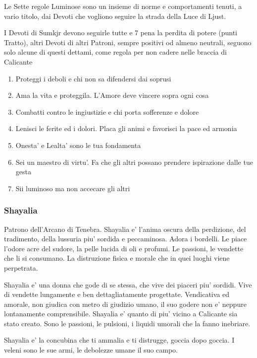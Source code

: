 \documentclass[a4paper,11pt,twoside,openany]{dndbook}
\begin{document}
{\label{le-7-regole-luminose}

Le Sette regole Luminose sono un insieme di norme e comportamenti tenuti, a vario titolo, dai Devoti che vogliono seguire la strada della Luce di Ljust.

I Devoti di Sumkjr devono seguirle tutte e 7 pena la perdita di potere (punti Tratto), altri Devoti di altri Patroni, sempre positivi od almeno neutrali, seguono solo alcune di questi dettami, come regola per non cadere nelle braccia di Calicante


\begin{enumerate}
	\item Proteggi i deboli e chi non sa difendersi dai soprusi
	\item Ama la vita e proteggila. L'Amore deve vincere sopra ogni cosa
	\item Combatti contro le ingiustizie e chi porta sofferenze e dolore
	\item Lenisci le ferite ed i dolori. Placa gli animi e favorisci la pace
	ed armonia
	\item Onesta' e Lealta' sono le tua fondamenta
	\item Sei un maestro di virtu'. Fa che gli altri possano prendere ispirazione
	dalle tue gesta
	\item Sii luminoso ma non accecare gli altri
\end{enumerate}

\subsubsection{Shayalia}

\label{shayalia}

Patrono dell'Arcano di Tenebra. Shayalia e' l'anima oscura della perdizione, del tradimento, della lussuria piu' sordida e peccaminosa. Adora i bordelli. Le piace l'odore acre del sudore, la pelle lucida di oli e profumi. Le passioni, le vendette che li si consumano. La distruzione fisica e morale che in quei luoghi viene perpetrata.

Shayalia e' una donna che gode di se stessa, che vive dei piaceri piu' sordidi. Vive di vendette lungamente e ben dettagliatamente progettate. Vendicativa ed amorale, non giudica con metro di giudizio umano, il suo godere non e' neppure lontanamente comprensibile. Shayalia e' quanto di piu' vicino a Calicante sia stato creato. Sono le passioni, le pulsioni, i liquidi umorali che la fanno inebriare.

Shayalia e' la concubina che ti ammalia e ti distrugge, goccia dopo goccia. I veleni sono le sue armi, le debolezze umane il suo campo.

}
\end{document}
